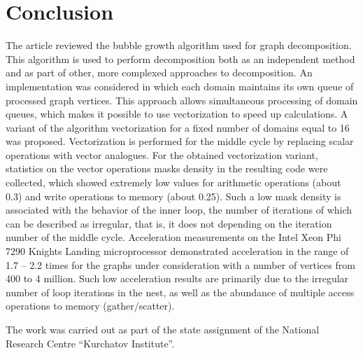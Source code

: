 \documentclass[
11pt,%
tightenlines,%
twoside,%
onecolumn,%
nofloats,%
nobibnotes,%
nofootinbib,%
superscriptaddress,%
noshowpacs,%
centertags]%
{revtex4}
\begin{document}
\section{Conclusion}

The article reviewed the bubble growth algorithm used for graph decomposition.
This algorithm is used to perform decomposition both as an independent method and as part of other, more complexed approaches to decomposition.
An implementation was considered in which each domain maintains its own queue of processed graph vertices.
This approach allows simultaneous processing of domain queues, which makes it possible to use vectorization to speed up calculations.
A variant of the algorithm vectorization for a fixed number of domains equal to 16 was proposed.
Vectorization is performed for the middle cycle by replacing scalar operations with vector analogues.
For the obtained vectorization variant, statistics on the vector operations masks density in the resulting code were collected, which showed extremely low values for arithmetic operations (about 0.3) and write operations to memory (about 0.25).
Such a low mask density is associated with the behavior of the inner loop, the number of iterations of which can be described as irregular, that is, it does not depending on the iteration number of the middle cycle.
Acceleration measurements on the Intel Xeon Phi 7290 Knights Landing microprocessor demonstrated acceleration in the range of 1.7 -- 2.2 times for the graphs under consideration with a number of vertices from 400 to 4 million.
Such low acceleration results are primarily due to the irregular number of loop iterations in the nest, as well as the abundance of multiple access operations to memory (gather/scatter).

\begin{acknowledgments}
The work was carried out as part of the state assignment of the National Research Centre \textquotedblleft Kurchatov Institute\textquotedblright.
\end{acknowledgments}

%
%
\end{document}
